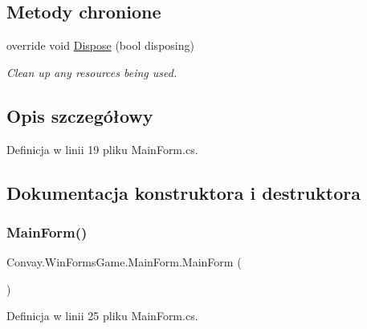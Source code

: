 \subsection*{Metody chronione}
\begin{DoxyCompactItemize}
\item 
override void \hyperlink{class_convay_1_1_win_forms_game_1_1_main_form_aa1405c65b2a14ad43edd6ae76537531b}{Dispose} (bool disposing)
\begin{DoxyCompactList}\small\item\em Clean up any resources being used. \end{DoxyCompactList}\end{DoxyCompactItemize}


\subsection{Opis szczegółowy}


Definicja w linii 19 pliku Main\+Form.\+cs.



\subsection{Dokumentacja konstruktora i destruktora}
\hypertarget{class_convay_1_1_win_forms_game_1_1_main_form_a777eb51af380321826a26ac3dacfcda0}{}\label{class_convay_1_1_win_forms_game_1_1_main_form_a777eb51af380321826a26ac3dacfcda0} 
\subsubsection{\texorpdfstring{Main\+Form()}{MainForm()}}
{\footnotesize\ttfamily Convay.\+Win\+Forms\+Game.\+Main\+Form.\+Main\+Form (\begin{DoxyParamCaption}{ }\end{DoxyParamCaption})}



Definicja w linii 25 pliku Main\+Form.\+cs.

